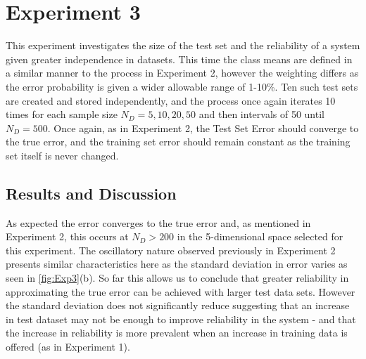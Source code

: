 \pagebreak
\section{Experiment 3}
This experiment investigates the size of the test set and the reliability of a system given greater independence in datasets. This time the class means are defined in a similar manner to the process in Experiment 2, however the weighting differs as the error probability is given a wider allowable range of 1-10\%. Ten such test sets are created and stored independently, and the process once again iterates 10 times for each sample size $N_{D} = 5, 10, 20, 50$ and then intervals of 50 until $N_{D} = 500$. Once again, as in Experiment 2, the Test Set Error should converge to the true error, and the training set error should remain constant as the training set itself is never changed.

\subsection{Results and Discussion}
As expected the error converges to the true error and, as mentioned in Experiment 2, this occurs at $N_{D} > 200$ in the 5-dimensional space selected for this experiment. The oscillatory nature observed previously in Experiment 2 presents similar characteristics here as the standard deviation in error varies as seen in \ref{fig:Exp3}(b). So far this allows us to conclude that greater reliability in approximating the true error can be achieved with larger test data sets. However the standard deviation does not significantly reduce suggesting that an increase in test dataset may not be enough to improve reliability in the system - and that the increase in reliability is more prevalent when an increase in training data is offered (as in Experiment 1).

